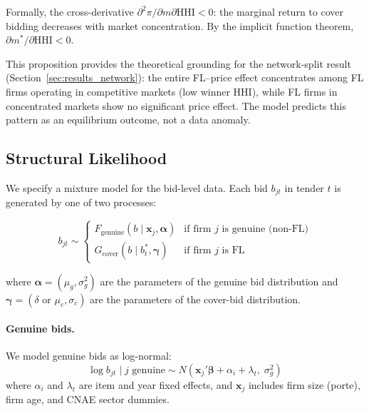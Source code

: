 Formally, the cross-derivative $\partial^2 \pi / \partial m \partial
\text{HHI} < 0$: the marginal return to cover bidding decreases with
market concentration. By the implicit function theorem,
$\partial m^* / \partial \text{HHI} < 0$.



This proposition provides the theoretical grounding for the network-split
result (Section~\ref{sec:results_network}): the entire FL--price effect
concentrates among FL firms operating in competitive markets (low winner
HHI), while FL firms in concentrated markets show no significant price
effect. The model predicts this pattern as an equilibrium outcome, not a
data anomaly.


\subsection{Structural Likelihood}
\label{sec:likelihood}

We specify a mixture model for the bid-level data. Each bid $b_{jt}$ in
tender $t$ is generated by one of two processes:

\begin{equation}
  b_{jt} \sim
  \begin{cases}
    F_{\text{genuine}}(b \mid \mathbf{x}_j, \boldsymbol{\alpha}) &
      \text{if firm } j \text{ is genuine (non-FL)} \\
    G_{\text{cover}}(b \mid b^*_t, \boldsymbol{\gamma}) &
      \text{if firm } j \text{ is FL}
  \end{cases}
  \label{eq:mixture}
\end{equation}

\noindent where $\boldsymbol{\alpha} = (\mu_g, \sigma_g^2)$ are the
parameters of the genuine bid distribution and $\boldsymbol{\gamma} =
(\delta \text{ or } \mu_c, \sigma_c)$ are the parameters of the
cover-bid distribution.

\paragraph{Genuine bids.} We model genuine bids as log-normal:
\begin{equation}
  \log b_{jt} \mid j \text{ genuine} \sim
  N\!\left(\mathbf{x}_j'\boldsymbol{\beta} + \alpha_i + \lambda_t,
  \; \sigma_g^2\right)
  \label{eq:genuine_dist}
\end{equation}
where $\alpha_i$ and $\lambda_t$ are item and year fixed effects, and
$\mathbf{x}_j$ includes firm size (porte), firm age, and CNAE sector
dummies.


